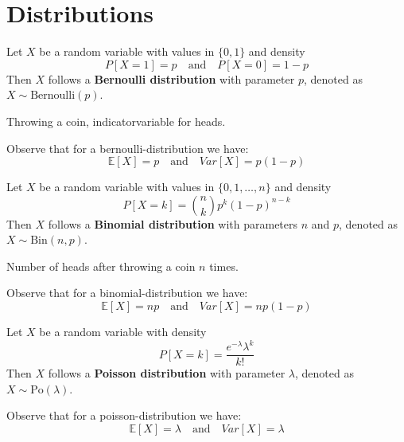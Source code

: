 \section{Distributions}

\begin{definition}
    Let $X$ be a random variable with values in $\{0,1\}$ and density
    $$P[X=1] = p \quad \text{and} \quad P[X=0] = 1-p$$
    Then $X$ follows a \textbf{Bernoulli distribution} with parameter $p$, denoted as $X \sim \text{Bernoulli}(p)$.
\end{definition}

\begin{example}
    Throwing a coin, indicatorvariable for heads.
\end{example}

\begin{remark}
    Observe that for a bernoulli-distribution we have:
    $$\mathbb{E}[X] = p \quad \text{and} \quad Var[X] = p(1-p)$$
\end{remark}

\begin{definition}
    Let $X$ be a random variable with values in $\{0,1,\dots,n\}$ and density
    $$P[X=k] = \binom{n}{k} p^k (1-p)^{n-k}$$
    Then $X$ follows a \textbf{Binomial distribution} with parameters $n$ and $p$, denoted as $X \sim \text{Bin}(n,p)$.
\end{definition}

\begin{example}
    Number of heads after throwing a coin $n$ times.
\end{example}

\begin{remark}
    Observe that for a binomial-distribution we have:
    $$\mathbb{E}[X] = np \quad \text{and} \quad Var[X] = np(1-p)$$
\end{remark}

\begin{definition}
    Let $X$ be a random variable with density
    $$P[X=k] = \frac{e^{-\lambda} \lambda^k}{k!}$$
    Then $X$ follows a \textbf{Poisson distribution} with parameter $\lambda$, denoted as $X \sim \text{Po}(\lambda)$.
\end{definition}

\begin{remark}
    Observe that for a poisson-distribution we have:
    $$\mathbb{E}[X] = \lambda \quad \text{and} \quad Var[X] = \lambda$$
\end{remark}

